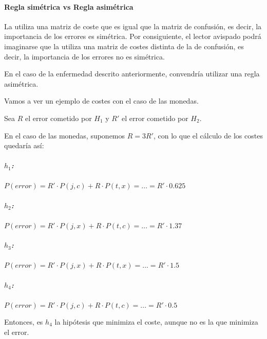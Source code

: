 \documentclass{apuntes}
\begin{document}
\paragraph{Regla simétrica vs Regla asimétrica}
 La  utiliza una matriz de coste que es igual que la matriz de confusión, es decir, la importancia de los errores es simétrica.  Por consiguiente, el lector avispado podrá imaginarse que la  utiliza una matriz de costes distinta de la de confusión, es decir, la importancia de los errores no es simétrica.

 En el caso de la enfermedad descrito anteriormente, convendría utilizar una regla asimétrica. 

 \begin{example}
Vamos a ver un ejemplo de costes con el caso de las monedas. 

Sea $R$ el error cometido por $H_1$ y $R'$ el error cometido por $H_2$. 

En el caso de las monedas, suponemos $R = 3R'$, con lo que el cálculo de los costes quedaría así:


\subparagraph{$h_1$:} $P(error) = R' · P(j,c) + R · P(t,x) = ... = R' · 0.625$
\subparagraph{$h_2$:} $P(error) = R' · P(j,x) + R · P(t,c) = ... = R' · 1.37$
\subparagraph{$h_3$:} $P(error) = R' · P(j,x) + R · P(t,x) = ... = R' · 1.5$
\subparagraph{$h_4$:} $P(error) = R' · P(j,c) + R · P(t,c) = ... = R' · 0.5$

Entonces, es $h_4$ la hipótesis que minimiza el coste, aunque no es la que minimiza el error.


 \end{example}
\end{document}
